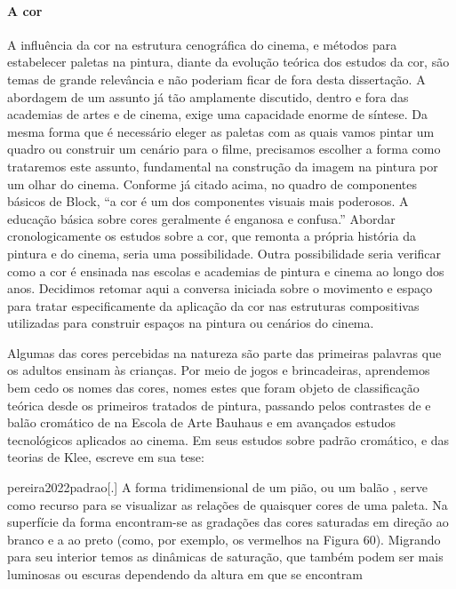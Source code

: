 \paragraph{A cor} A influência da cor na estrutura cenográfica do cinema, e métodos para
estabelecer paletas na pintura, diante da evolução teórica dos estudos
da cor, são temas de grande relevância e não poderiam ficar de fora
desta dissertação. A abordagem de um assunto já tão amplamente
discutido, dentro e fora das academias de artes e de cinema, exige uma
capacidade enorme de síntese. Da mesma forma que é necessário eleger as
paletas com as quais vamos pintar um quadro ou construir um cenário
para o filme, precisamos escolher a forma como trataremos este assunto,
fundamental na construção da imagem na pintura por um olhar do cinema.
Conforme já citado acima, no quadro de componentes básicos de Block,
\enquote{a cor é um dos componentes visuais mais poderosos. A educação
	básica sobre cores geralmente é enganosa e confusa.} Abordar
cronologicamente os estudos sobre a cor, que remonta a própria história
da pintura e do cinema, seria uma possibilidade. Outra possibilidade
seria verificar como a cor é ensinada nas escolas e academias de
pintura e cinema ao longo dos anos. Decidimos retomar aqui a conversa
iniciada sobre o movimento e espaço para tratar especificamente da
aplicação da cor nas estruturas compositivas utilizadas para construir
espaços na pintura ou cenários do cinema.

Algumas das cores percebidas na natureza são parte das primeiras
palavras que os adultos ensinam às crianças. Por meio de jogos e
brincadeiras, aprendemos bem cedo os nomes das cores, nomes estes que
foram objeto de classificação teórica desde os primeiros tratados de
pintura, passando pelos contrastes de \textcite{itten1975arte} e balão cromático de
\textcite{klee1971theorie} na Escola de Arte Bauhaus e em avançados estudos
tecnológicos aplicados ao cinema. Em seus estudos sobre padrão
cromático, e das teorias de Klee, \textcite{pereira2022padrao} escreve em sua tese:

\begin{displaycquote}[60-61]{pereira2022padrao}[.]
	A forma tridimensional de um pião, ou um balão \textelp{}, serve como recurso
	para se visualizar as relações de quaisquer cores de uma paleta. Na
	superfície da forma encontram-se as gradações das cores saturadas em
	direção ao branco e a ao preto (como, por exemplo, os vermelhos na
	Figura 60). Migrando para seu interior temos as dinâmicas de saturação,
	que também podem ser mais luminosas ou escuras dependendo da altura em
	que se encontram
\end{displaycquote}

